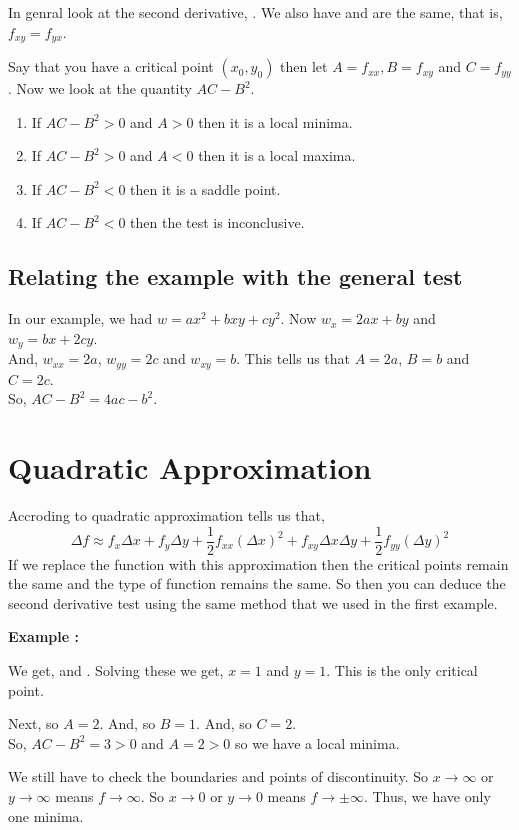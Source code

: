 In genral look at the second derivative, .
We also have  and  are the same, that is, $f_{xy} = f_{yx}$.

Say that you have a critical point $(x_0, y_0)$ then let $A = f_{xx}, B = f_{xy}$ and $C = f_{yy}$.
Now we look at the quantity $AC - B^2$.

\begin{enumerate}
    \item If $AC - B^2 > 0$ and $A > 0$ then it is a local minima.
    \item If $AC - B^2 > 0$ and $A < 0$ then it is a local maxima.
    \item If $AC - B^2 < 0$ then it is a saddle point.
    \item If $AC - B^2 < 0$ then the test is inconclusive.
\end{enumerate}

\subsection{Relating the example with the general test}

In our example, we had $w = ax^2 + bxy + cy^2$. Now $w_x = 2ax + by$ and $w_{y} = bx + 2cy$. \\
And, $w_{xx} = 2a$, $w_{yy} = 2c$ and $w_{xy} = b$. This tells us that $A = 2a$, $B = b$ and $C = 2c$. \\
So, $AC - B^2 = 4ac - b^2$.


\section{Quadratic Approximation}

Accroding to quadratic approximation tells us that, 
$$
\Delta f \approx f_x \Delta x + f_y \Delta y + \frac{1}{2} f_{xx} (\Delta x)^2 + f_{xy} \Delta x \Delta y + \frac{1}{2} f_{yy} (\Delta y)^2 
$$
If we replace the function with this approximation then the critical points remain the same and the type of function remains the same.
So then you can deduce the second derivative test using the same method that we used in the first example.

{\bf Example : } 

We get,  and  .
Solving these we get, $x = 1$ and $y = 1$. This is the only critical point.

Next,  so $A = 2$. 
And,  so $B = 1$.
And,  so $C = 2$. \\
So, $AC - B^2 = 3 > 0$ and $A = 2 > 0$ so we have a local minima.

We still have to check the boundaries and points of discontinuity. 
So $x \to \infty$ or $y \to \infty$ means $f \to \infty$.
So $x \to 0$ or $y \to 0$ means $f \to \pm \infty$. Thus, we have only one minima.
